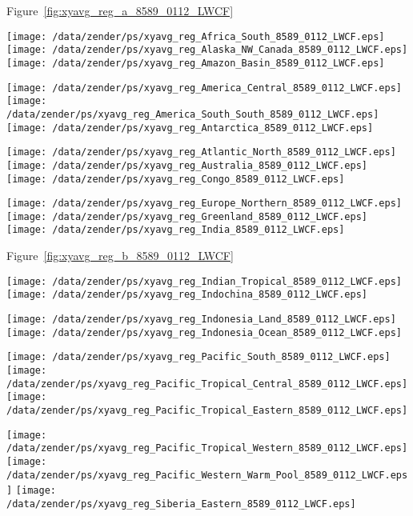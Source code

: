 \documentclass[agupp]{aguplus}
\begin{document}
Figure~\ref{fig:xyavg_reg_a_8589_0112_LWCF}
\begin{figure*}
\texttt{[image: /data/zender/ps/xyavg\_reg\_Africa\_South\_8589\_0112\_LWCF.eps]}%
\texttt{[image: /data/zender/ps/xyavg\_reg\_Alaska\_NW\_Canada\_8589\_0112\_LWCF.eps]}%
\texttt{[image: /data/zender/ps/xyavg\_reg\_Amazon\_Basin\_8589\_0112\_LWCF.eps]}%

\texttt{[image: /data/zender/ps/xyavg\_reg\_America\_Central\_8589\_0112\_LWCF.eps]}%
\texttt{[image: /data/zender/ps/xyavg\_reg\_America\_South\_South\_8589\_0112\_LWCF.eps]}%
\texttt{[image: /data/zender/ps/xyavg\_reg\_Antarctica\_8589\_0112\_LWCF.eps]}%

\texttt{[image: /data/zender/ps/xyavg\_reg\_Atlantic\_North\_8589\_0112\_LWCF.eps]}%
\texttt{[image: /data/zender/ps/xyavg\_reg\_Australia\_8589\_0112\_LWCF.eps]}%
\texttt{[image: /data/zender/ps/xyavg\_reg\_Congo\_8589\_0112\_LWCF.eps]}%

\texttt{[image: /data/zender/ps/xyavg\_reg\_Europe\_Northern\_8589\_0112\_LWCF.eps]}%
\texttt{[image: /data/zender/ps/xyavg\_reg\_Greenland\_8589\_0112\_LWCF.eps]}%
\texttt{[image: /data/zender/ps/xyavg\_reg\_India\_8589\_0112\_LWCF.eps]}%
\caption{Seasonal amplitude in regional longwave cloud
forcing (\wxmS ) for ERBE, CCM, and ANV. Month 1 is January. 
\label{fig:xyavg_reg_a_8589_0112_LWCF}}   
\end{figure*}

Figure~\ref{fig:xyavg_reg_b_8589_0112_LWCF}
\begin{figure*}
\texttt{[image: /data/zender/ps/xyavg\_reg\_Indian\_Tropical\_8589\_0112\_LWCF.eps]}%
\texttt{[image: /data/zender/ps/xyavg\_reg\_Indochina\_8589\_0112\_LWCF.eps]}%

\texttt{[image: /data/zender/ps/xyavg\_reg\_Indonesia\_Land\_8589\_0112\_LWCF.eps]}%
\texttt{[image: /data/zender/ps/xyavg\_reg\_Indonesia\_Ocean\_8589\_0112\_LWCF.eps]}%

\texttt{[image: /data/zender/ps/xyavg\_reg\_Pacific\_South\_8589\_0112\_LWCF.eps]}%
\texttt{[image: /data/zender/ps/xyavg\_reg\_Pacific\_Tropical\_Central\_8589\_0112\_LWCF.eps]}%
\texttt{[image: /data/zender/ps/xyavg\_reg\_Pacific\_Tropical\_Eastern\_8589\_0112\_LWCF.eps]}%

\texttt{[image: /data/zender/ps/xyavg\_reg\_Pacific\_Tropical\_Western\_8589\_0112\_LWCF.eps]}%
\texttt{[image: /data/zender/ps/xyavg\_reg\_Pacific\_Western\_Warm\_Pool\_8589\_0112\_LWCF.eps]}%
\texttt{[image: /data/zender/ps/xyavg\_reg\_Siberia\_Eastern\_8589\_0112\_LWCF.eps]}%
\caption{Seasonal amplitude in regional longwave cloud
forcing (\wxmS ) for ERBE, CCM, and ANV. Month 1 is January. 
\label{fig:xyavg_reg_b_8589_0112_LWCF}}   
\end{figure*}
\end{document}
